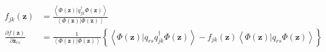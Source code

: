\documentclass[aps,preprint]{revtex4}%
\begin{document}
\begin{align}
f_{jk}\left(  \mathbf{z}\right)    & =\frac{\left\langle \left.  \Phi\left(
\mathbf{z}\right)  \right\vert q_{jk}^{\dagger}\Phi\left(  \mathbf{z}\right)
\right\rangle }{\left\langle \left.  \Phi\left(  \mathbf{z}\right)
\right\vert \Phi\left(  \mathbf{z}\right)  \right\rangle }\\
\frac{\partial f\left(  \mathbf{z}\right)  }{\partial\mathbf{\bar{z}}_{rs}}  &
=\frac{1}{\left\langle \left.  \Phi\left(  \mathbf{z}\right)  \right\vert
\Phi\left(  \mathbf{z}\right)  \right\rangle }\left\{  \left\langle \left.
\Phi\left(  \mathbf{z}\right)  \right\vert q_{rs}q_{jk}^{\dagger}\Phi\left(
\mathbf{z}\right)  \right\rangle -f_{jk}\left(  \mathbf{z}\right)
\left\langle \left.  \Phi\left(  \mathbf{z}\right)  \right\vert q_{rs}%
\Phi\left(  \mathbf{z}\right)  \right\rangle \right\}
\end{align}
\end{document}
